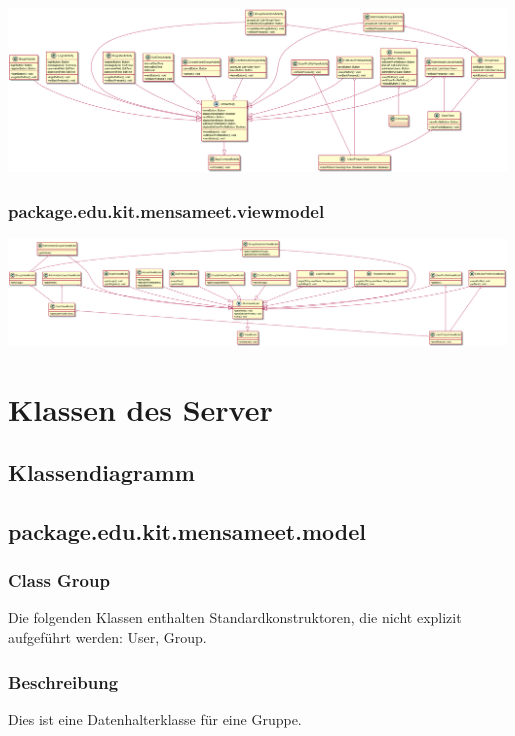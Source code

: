 \documentclass[a4paper]{scrreprt}
\begin{document}
\begin{center}
 \includegraphics[width=0.99\textwidth]{GUI/frontend_view.png}
\end{center}


\newpage
\subsubsection{package.edu.kit.mensameet.viewmodel}
\begin{center}
	\includegraphics[width=0.99\textwidth]{GUI/frontend_viewmodel.png}
\end{center}

\section{Klassen des Server}
\subsection{Klassendiagramm}

\subsection{package.edu.kit.mensameet.model}
\subsubsection{Class Group}
Die folgenden Klassen enthalten Standardkonstruktoren, die nicht explizit aufgeführt werden: User, Group.
\subsubsection*{Beschreibung}
Dies ist eine Datenhalterklasse für eine Gruppe. 
\end{document}
